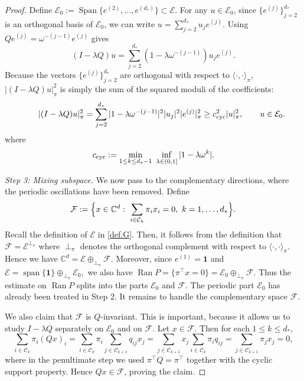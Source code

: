 \documentclass[11pt,twoside, a4paper]{article}
\numberwithin{equation}{section}
\numberwithin{figure}{section}
\theoremstyle{plain} %
\theoremstyle{definition}
\theoremstyle{remark}
\newcommand{\1} {\mspace{1 mu}}
\newcommand{\2} {\mspace{2 mu}}
\newcommand{\C} {{\mathbb{C}}}
\DeclareMathOperator{\spn}{Span}
\begin{document}
\begin{proof}
\smallskip
Define $\mathcal{E}_0:=\spn\{e^{(2)},\dots,e^{(d_*)}\}\subset\mathcal{E}$. For any $u\in\mathcal{E}_0$, since $\{e^{(j)}\}_{j=2}^{d_*}$ is an orthogonal basis of $\mathcal{E}_0$, 
we can write
$
u=\sum_{j=2}^{d_*} u_{j} e^{(j)}.
$
Using $Qe^{(j)}=\omega^{-(j-1)} e^{(j)}$ gives
\[
(I-\lambda Q)u=\sum_{j=2}^{d_*}(1-\lambda\omega^{-(j-1)})u_{j} e^{(j)}.
\]
Because the vectors \(\{e^{(j)}\}_{j=2}^{d_*}\) are orthogonal with respect to \(\langle\cdot,\cdot\rangle_\pi\), \(|(I-\lambda Q)u|^2_\pi\) is simply the sum of the squared moduli of the coefficients:
\begin{equation}\label{eq:cyc-gap-lambda}
    \qquad |(I-\lambda Q)u|_\pi^2=\sum_{j=2}^{d_*}|1-\lambda\omega^{-(j-1)}|^2 |u_j|^2 |e^{(j)}|_\pi^2\ge c^2_{\rm cyc} |u|^2_\pi,\qquad u\in\mathcal{E}_0.
\end{equation}
where
\begin{equation*}
    c_{\rm cyc}:=\min_{1\le k\le d_*-1}\ \inf_{\lambda\in(0,1]}|1-\lambda\omega^k|.  
\end{equation*}



\medskip
\noindent\textit{Step 3: Mixing subspace.}
We now pass to the complementary directions, where the periodic oscillations
have been removed. 
Define
\[
  \mathcal F
  :=
  \Bigl\{
  x\in\C^d:\ \sum_{i\in\mathcal C_k}\pi_i x_i=0,
  \ k=1,\dots,d_*
  \Bigr\}.
\]
Recall the definition of $\mathcal{E}$ in \eqref{def.G}.
Then, it follows from the definition that $\mathcal{F}=\mathcal E^{\perp_\pi}$ where \(\perp_\pi\) denotes the orthogonal complement with respect to $\langle\cdot,\cdot\rangle_\pi$.
Hence we have
$
  \C^d=\mathcal E\oplus_{\perp_\pi}\mathcal F .
$
Moreover, since \(e^{(1)}=\mathbf 1\) and
$
  \mathcal E=\operatorname{span}\{\mathbf 1\}
  \oplus_{\perp_\pi}\mathcal E_0,
$
we also have
$
  \operatorname{Ran}P
  =
  \{\pi^\top x=0\}
  =
  \mathcal E_0\oplus_{\perp_\pi}\mathcal F .
$
Thus the estimate on \(\operatorname{Ran}P\) splits into the parts
\(\mathcal E_0\) and \(\mathcal F\). The periodic
part \(\mathcal E_0\) has already been treated in Step 2. It remains
to handle the complementary space \(\mathcal F\).


We also claim that \(\mathcal F\) is \(Q\)-invariant. This is important, because it allows us to study \(I-\lambda Q\) separately on \(\mathcal E_0\) and on \(\mathcal F\). Let \(x\in \mathcal F\). Then for each \(1\le k\le d_*\),
\[
\sum_{i\in \mathcal{C}_{k}}\pi_i (Qx)_i
=
\sum_{i\in \mathcal{C}_{k}}\pi_i \sum_{j\in \mathcal{C}_{k+1}}q_{ij}x_j
=
\sum_{j\in \mathcal{C}_{k+1}}x_j \sum_{i\in \mathcal{C}_{k}}\pi_i q_{ij}
=
\sum_{j\in \mathcal{C}_{k+1}}\pi_j x_j
=
0,
\]
where in the penultimate step we used \(\pi^\top Q=\pi^\top\) together with the cyclic support property. Hence \(Qx\in \mathcal F\), proving the claim.


\end{proof}
\end{document}
